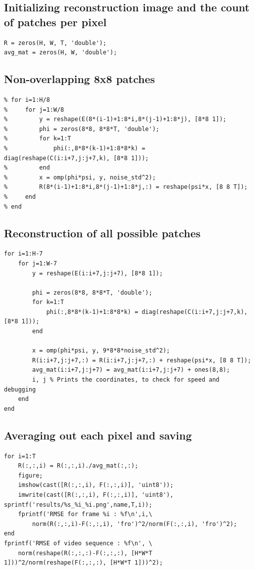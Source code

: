 \documentclass[fleqn, 11pt]{article}
\begin{document}
\subsection*{Initializing reconstruction image and the count of patches per pixel}
\begin{verbatim}
R = zeros(H, W, T, 'double');
avg_mat = zeros(H, W, 'double');
\end{verbatim}

\subsection*{Non-overlapping 8x8 patches}
\begin{verbatim}
% for i=1:H/8
%     for j=1:W/8
%         y = reshape(E(8*(i-1)+1:8*i,8*(j-1)+1:8*j), [8*8 1]);
%         phi = zeros(8*8, 8*8*T, 'double');
%         for k=1:T
%             phi(:,8*8*(k-1)+1:8*8*k) = diag(reshape(C(i:i+7,j:j+7,k), [8*8 1]));
%         end
%         x = omp(phi*psi, y, noise_std^2);
%         R(8*(i-1)+1:8*i,8*(j-1)+1:8*j,:) = reshape(psi*x, [8 8 T]);
%     end
% end
\end{verbatim}

\subsection*{Reconstruction of all possible patches}
\begin{verbatim}
for i=1:H-7
    for j=1:W-7
        y = reshape(E(i:i+7,j:j+7), [8*8 1]);

        phi = zeros(8*8, 8*8*T, 'double');
        for k=1:T
            phi(:,8*8*(k-1)+1:8*8*k) = diag(reshape(C(i:i+7,j:j+7,k), [8*8 1]));
        end
        
        x = omp(phi*psi, y, 9*8*8*noise_std^2);
        R(i:i+7,j:j+7,:) = R(i:i+7,j:j+7,:) + reshape(psi*x, [8 8 T]);
        avg_mat(i:i+7,j:j+7) = avg_mat(i:i+7,j:j+7) + ones(8,8);
        i, j % Prints the coordinates, to check for speed and debugging
    end
end
\end{verbatim}

\subsection*{Averaging out each pixel and saving}
\begin{verbatim}
for i=1:T
    R(:,:,i) = R(:,:,i)./avg_mat(:,:);
    figure;
    imshow(cast([R(:,:,i), F(:,:,i)], 'uint8'));
    imwrite(cast([R(:,:,i), F(:,:,i)], 'uint8'), sprintf('results/%s_%i_%i.png',name,T,i));
    fprintf('RMSE for frame %i : %f\n',i,\
        norm(R(:,:,i)-F(:,:,i), 'fro')^2/norm(F(:,:,i), 'fro')^2);
end
fprintf('RMSE of video sequence : %f\n', \
    norm(reshape(R(:,:,:)-F(:,:,:), [H*W*T 1]))^2/norm(reshape(F(:,:,:), [H*W*T 1]))^2);
\end{verbatim}
\end{document}
